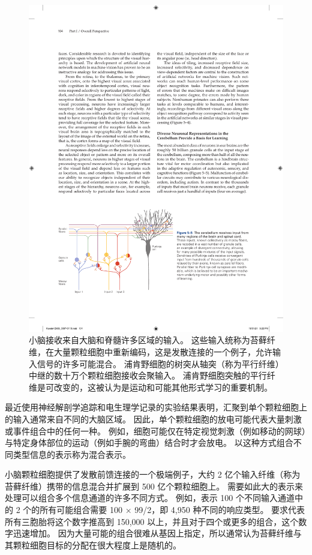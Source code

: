 \begin{figure}[htbp]
	\centering
	\includegraphics[width=1.0\linewidth]{chap05/fig_5_5}
	\caption{小脑接收来自大脑和脊髓许多区域的输入。 
		这些输入统称为苔藓纤维，在大量颗粒细胞中重新编码，这是发散连接的一个例子，允许输入信号的许多可能混合。 
		浦肯野细胞的树突从轴突（称为平行纤维）中继的数十万个颗粒细胞接收会聚输入。 
		浦肯野细胞突触的平行纤维是可改变的，这被认为是运动和可能其他形式学习的重要机制。}
	\label{fig:5_5}
\end{figure}


最近使用神经解剖学追踪和电生理学记录的实验结果表明，汇聚到单个颗粒细胞上的输入通常来自不同的大脑区域。
因此，单个颗粒细胞的放电可能代表大量刺激或事件组合中的任何一种。
例如，细胞可能仅在特定视觉刺激（例如移动的网球）与特定身体部位的运动（例如手腕的弯曲）结合时才会放电。
以这种方式组合不同类型信息的表示称为混合表示。


小脑颗粒细胞提供了发散前馈连接的一个极端例子，大约 2 亿个输入纤维（称为苔藓纤维）携带的信息混合并扩展到 500 亿个颗粒细胞上。
需要如此大的表示来处理可以组合多个信息通道的许多不同方式。
例如，表示 100 个不同输入通道中的 2 个的所有可能组合需要 100 × 99/2，即 4,950 种不同的响应类型。
要求代表所有三胞胎将这个数字推高到 150,000 以上，并且对于四个或更多的组合，这个数字迅速增加。 
因为大量可能的组合很难从基因上指定，所以通常认为苔藓纤维与其颗粒细胞目标的分配在很大程度上是随机的。


